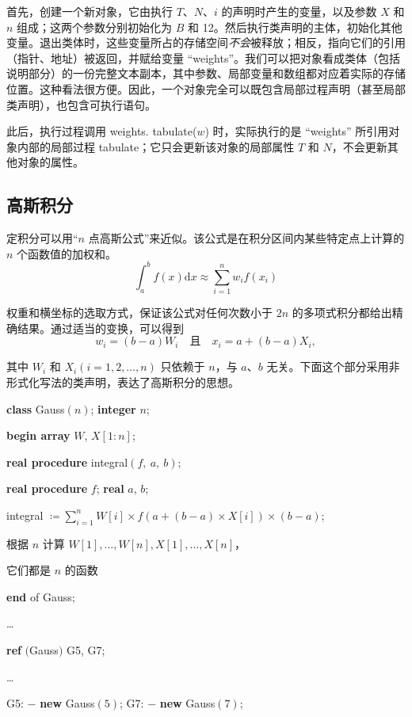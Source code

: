 \documentclass[twoside,11pt,fontset=none]{ctexbook}
\begin{document}
\noindent
首先，创建一个新对象，它由执行 $T$、$N$、$i$ 的声明时产生的变量，以及参数 $X$ 和 $n$ 组成；这两个参数分别初始化为 $B$ 和 12。然后执行类声明的主体，初始化其他变量。退出类体时，这些变量所占的存储空间\textit{不会}被释放；相反，指向它们的引用（指针、地址）被返回，并赋给变量 ``weights''。我们可以把对象看成类体（包括说明部分）的一份完整文本副本，其中参数、局部变量和数组都对应着实际的存储位置。这种看法很方便。因此，一个对象完全可以既包含局部过程声明（甚至局部类声明），也包含可执行语句。

此后，执行过程调用 weights. tabulate($w$) 时，实际执行的是 ``weights'' 所引用对象内部的局部过程 tabulate；它只会更新该对象的局部属性 $T$ 和 $N$，不会更新其他对象的属性。

\subsection{高斯积分}

定积分可以用“$n$ 点高斯公式”来近似。该公式是在积分区间内某些特定点上计算的 $n$ 个函数值的加权和。
$$
\int_a^b f(x)\text{d}x \approx \sum_{i = 1}^n w_i f(x_i)
$$

\noindent
权重和横坐标的选取方式，保证该公式对任何次数小于 $2n$ 的多项式积分都给出精确结果。通过适当的变换，可以得到
$$
w_i = (b - a)W_i \quad\text{且}\quad x_i = a + (b - a)X_i,
$$

\noindent
其中 $W_i$ 和 $X_i(i = 1, 2, \dots, n)$ 只依赖于 $n$，与 $a$、$b$ 无关。下面这个部分采用非形式化写法的类声明，表达了高斯积分的思想。

\quad \textbf{class} Gauss$(n)$; \textbf{integer} $n$;

\quad \textbf{begin array} $W$, $X[1:n]$;

\quad \quad \textbf{real procedure} integral$(f,\ a,\ b)$;

\quad \quad \textbf{real procedure} $f$; \textbf{real} $a$, $b$;

\quad \quad integral $\coloneq \sum_{i=1}^n W[i] \times f(a + (b - a)\times X[i])\times (b- a)$;

\quad \quad 根据 $n$ 计算 $W[1], \dots, W[n], X[1], \dots, X[n]$，

\quad \quad 它们都是 $n$ 的函数

\quad \textbf{end} of Gauss;

\quad \dots

\quad \textbf{ref} $($Gauss$)$ G5, G7;

\quad \dots

\quad G5: $-$ \textbf{new} Gauss$(5)$; G7: $-$ \textbf{new} Gauss$(7)$;
\end{document}
